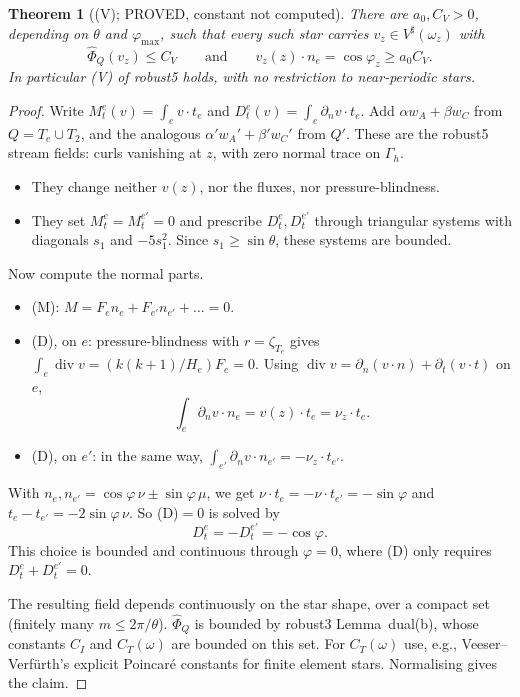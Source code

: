 \documentclass[11pt]{article}
\newtheorem{theorem}{Theorem}[section]
\theoremstyle{remark}
\newcommand{\Gh}{\Gamma_h}
\begin{document}
\begin{theorem}[(V); PROVED, constant not computed]\label{thm:V}
There are $a_0,C_V>0$, depending on $\theta$ and $\varphi_{\max}$, such that every such star carries $v_z\in V^\sharp(\omega_z)$ with
\[
\hat\Phi_Q(v_z)\le C_V\qquad\text{and}\qquad v_z(z)\cdot n_e=\cos\varphi_z\ge a_0C_V .
\]
In particular (V) of robust5 holds, with no restriction to near-periodic stars.
\end{theorem}
\begin{proof}
Write $M_t^e(v)=\int_ev\cdot t_e$ and $D_t^e(v)=\int_e\partial_nv\cdot t_e$. Add $\alpha w_A+\beta w_C$ from $Q=T_e\cup T_2$, and the
analogous $\alpha'w_A'+\beta'w_C'$ from $Q'$. These are the robust5 stream fields: curls vanishing at $z$, with zero normal trace on $\Gh$.
\begin{itemize}
\item They change neither $v(z)$, nor the fluxes, nor pressure-blindness.
\item They set $M_t^e=M_t^{e'}=0$ and prescribe $D_t^e,D_t^{e'}$ through triangular systems with diagonals $s_1$ and $-5s_1^2$. Since
$s_1\ge\sin\theta$, these systems are bounded.
\end{itemize}
Now compute the normal parts.
\begin{itemize}
\item (M): $M=F_en_e+F_{e'}n_{e'}+\dots=0$.
\item (D), on $e$: pressure-blindness with $r=\zeta_{T_e}$ gives $\int_e\operatorname{div}v=(k(k+1)/H_e)F_e=0$. Using
$\operatorname{div}v=\partial_n(v\cdot n)+\partial_t(v\cdot t)$ on $e$,
\[
\int_e\partial_nv\cdot n_e=v(z)\cdot t_e=\nu_z\cdot t_e .
\]
\item (D), on $e'$: in the same way, $\int_{e'}\partial_nv\cdot n_{e'}=-\nu_z\cdot t_{e'}$.
\end{itemize}
With $n_{e},n_{e'}=\cos\varphi\,\nu\pm\sin\varphi\,\mu$, we get $\nu\cdot t_e=-\nu\cdot t_{e'}=-\sin\varphi$ and $t_e-t_{e'}=-2\sin\varphi\,\nu$.
So (D)$=0$ is solved by
\[
D_t^e=-D_t^{e'}=-\cos\varphi .
\]
This choice is bounded and continuous through $\varphi=0$, where (D) only requires $D_t^e+D_t^{e'}=0$.

The resulting field depends continuously on the star shape, over a compact set (finitely many $m\le2\pi/\theta$). $\hat\Phi_Q$ is bounded
by robust3 Lemma~dual(b), whose constants $C_I$ and $C_T(\omega)$ are bounded on this set. For $C_T(\omega)$ use, e.g., Veeser--Verf\"urth's
explicit Poincar\'e constants for finite element stars. Normalising gives the claim.
\end{proof}
\end{document}
